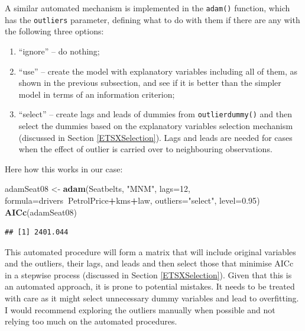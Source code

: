 \documentclass[]{book}
\newenvironment{Shaded}{\begin{snugshade}}{\end{snugshade}}
\newcommand{\DataTypeTok}[1]{\textcolor[rgb]{0.13,0.29,0.53}{#1}}
\newcommand{\DecValTok}[1]{\textcolor[rgb]{0.00,0.00,0.81}{#1}}
\newcommand{\FloatTok}[1]{\textcolor[rgb]{0.00,0.00,0.81}{#1}}
\newcommand{\KeywordTok}[1]{\textcolor[rgb]{0.13,0.29,0.53}{\textbf{#1}}}
\newcommand{\NormalTok}[1]{#1}
\newcommand{\OperatorTok}[1]{\textcolor[rgb]{0.81,0.36,0.00}{\textbf{#1}}}
\newcommand{\StringTok}[1]{\textcolor[rgb]{0.31,0.60,0.02}{#1}}
\providecommand{\tightlist}{%
  \setlength{\itemsep}{0pt}\setlength{\parskip}{0pt}}
\theoremstyle{definition}
\theoremstyle{definition}
\theoremstyle{definition}
\theoremstyle{definition}
\theoremstyle{remark}
\begin{document}
A similar automated mechanism is implemented in the \texttt{adam()} function, which has the \texttt{outliers} parameter, defining what to do with them if there are any with the following three options:

\begin{enumerate}
\def\labelenumi{\arabic{enumi}.}
\tightlist
\item
  ``ignore'' -- do nothing;
\item
  ``use'' -- create the model with explanatory variables including all of them, as shown in the previous subsection, and see if it is better than the simpler model in terms of an information criterion;
\item
  ``select'' -- create lags and leads of dummies from \texttt{outlierdummy()} and then select the dummies based on the explanatory variables selection mechanism (discussed in Section \ref{ETSXSelection}). Lags and leads are needed for cases when the effect of outlier is carried over to neighbouring observations.
\end{enumerate}

Here how this works in our case:

\begin{Shaded}
\begin{Highlighting}[]
\NormalTok{adamSeat08 <-}\StringTok{ }\KeywordTok{adam}\NormalTok{(Seatbelts, }\StringTok{"MNM"}\NormalTok{, }\DataTypeTok{lags=}\DecValTok{12}\NormalTok{,}
                   \DataTypeTok{formula=}\NormalTok{drivers}\OperatorTok{~}\NormalTok{PetrolPrice}\OperatorTok{+}\NormalTok{kms}\OperatorTok{+}\NormalTok{law,}
                   \DataTypeTok{outliers=}\StringTok{"select"}\NormalTok{, }\DataTypeTok{level=}\FloatTok{0.95}\NormalTok{)}
\KeywordTok{AICc}\NormalTok{(adamSeat08)}
\end{Highlighting}
\end{Shaded}

\begin{verbatim}
## [1] 2401.044
\end{verbatim}

This automated procedure will form a matrix that will include original variables and the outliers, their lags, and leads and then select those that minimise AICc in a stepwise process (discussed in Section \ref{ETSXSelection}). Given that this is an automated approach, it is prone to potential mistakes. It needs to be treated with care as it might select unnecessary dummy variables and lead to overfitting. I would recommend exploring the outliers manually when possible and not relying too much on the automated procedures.
\end{document}
